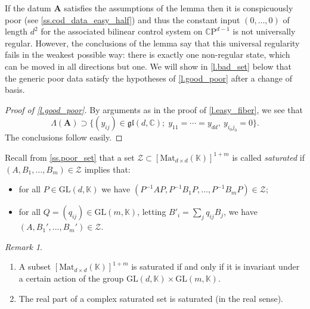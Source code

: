 \documentclass[10pt, a4paper]{amsart}
\theoremstyle{plain}
\theoremstyle{definition}
\theoremstyle{remark}
\theoremstyle{note}
\newtheorem{rem}[lemma]{Remark}
\numberwithin{equation}{section}
\begin{document}
If the datum ${\mathbf{A}}$ satisfies the assumptions of the lemma
then it is conspicuously poor (see \cref{ss.cod_data_easy_half})
and thus the constant input $(0,\dots,0)$ of length $d^2$
for the associated bilinear control system on ${\mathbb{C}\mathrm{P}}^{d-1}$
is not universally regular.
However, the conclusions of the lemma say that this universal regularity fails in 
the weakest possible way: there is exactly one non-regular state,
which can be moved in all directions but one.
We will show in \cref{l.bad_set} below that the generic poor data
satisfy the hypotheses of \cref{l.good_poor} after a change of basis.

\begin{proof}[Proof of \cref{l.good_poor}]
By arguments as in the proof of \cref{l.easy_fiber},
we see that 
$$
\Lambda({\mathbf{A}}) \supset
\big\{ (y_{ij}) \in {\mathfrak{gl}}(d,{\mathbb{C}}) ; \; y_{11} = \cdots = y_{dd}, \ y_{i_0 j_0} = 0 \big\}.
$$	
The conclusions follow easily.
\end{proof}

\medskip

Recall from \cref{ss.poor_set} that a set ${\mathcal{Z}} \subset [{\mathrm{Mat}}_{d\times d}({\mathbb{K}})]^{1+m}$
is called \emph{saturated} if
$(A, B_1, \dots, B_m) \in {\mathcal{Z}}$ implies that:
\begin{itemize}
\item 
for all $P \in {\mathrm{GL}}(d,{\mathbb{K}})$ we have $(P^{-1}AP, P^{-1}B_1 P, \dots, P^{-1}B_m P) \in {\mathcal{Z}}$;
\item 
for all $Q = (q_{ij}) \in {\mathrm{GL}}(m,{\mathbb{K}})$, letting $B'_i = \sum_j q_{ij} B_j$,
we have $(A, B_1', \dots, B_m') \in {\mathcal{Z}}$.
\end{itemize}

\begin{rem}\label{r.saturation_properties}
\begin{enumerate}
\item\label{i.saturation_properties_1}
A subset $[{\mathrm{Mat}}_{d\times d}({\mathbb{K}})]^{1+m}$ is saturated if and only if it is invariant under a certain action of the group ${\mathrm{GL}}(d,{\mathbb{K}})\times{\mathrm{GL}}(m,{\mathbb{K}})$.
\item\label{i.saturation_properties_2}
The real part of a complex saturated set is saturated (in the real sense).
\end{enumerate}
\end{rem}
\end{document}
